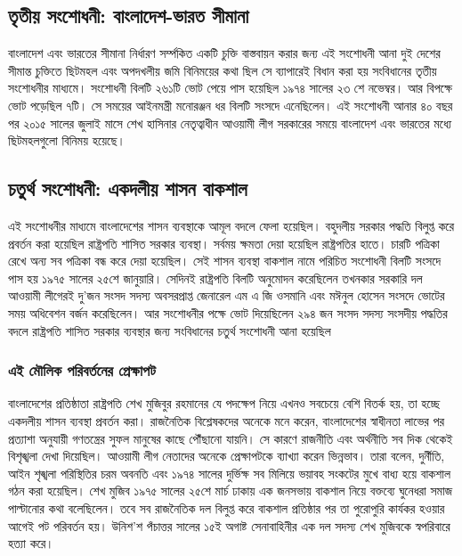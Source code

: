 \documentclass[11pt]{article}
\begin{document}
\subsection{তৃতীয় সংশোধনী: বাংলাদেশ-ভারত সীমানা}
\label{sec:orgc66b266}
বাংলাদেশ এবং ভারতের সীমানা নির্ধারণ সর্ম্পকিত একটি চুক্তি
বাস্তবায়ন করার জন্য এই সংশোধনী আনা দুই দেশের সীমান্ত চুক্তিতে
ছিটমহল এবং অপদখলীয় জমি বিনিময়ের কথা ছিল সে ব্যাপারেই বিধান
করা হয় সংবিধানের তৃতীয় সংশোধনীর মাধ্যমে। সংশোধনী বিলটি ২৬১টি
ভোট পেয়ে পাস হয়েছিল ১৯৭৪ সালের ২৩ শে নভেম্বর। আর বিপক্ষে ভোট
পড়েছিল ৭টি। সে সময়ের আইনমন্ত্রী মনোরঞ্জন ধর বিলটি সংসদে
এনেছিলেন। এই সংশোধনী আনার ৪০ বছর পর ২০১৫ সালের জুলাই মাসে শেখ
হাসিনার নেতৃত্বাধীন আওয়ামী লীগ সরকারের সময়ে বাংলাদেশ এবং
ভারতের মধ্যে ছিটমহলগুলো বিনিময় হয়েছে।

\subsection{চতুর্থ সংশোধনী: একদলীয় শাসন বাকশাল}
\label{sec:orgc11be26}
এই সংশোধনীর মাধ্যমে বাংলাদেশের শাসন ব্যবস্থাকে আমূল বদলে ফেলা
হয়েছিল। বহুদলীয় সরকার পদ্ধতি বিলুপ্ত করে প্রবর্তন করা হয়েছিল
রাষ্ট্রপতি শাসিত সরকার ব্যবস্থা। সর্বময় ক্ষমতা দেয়া হয়েছিল
রাষ্ট্রপতির হাতে। চারটি পত্রিকা রেখে অন্য সব পত্রিকা বন্ধ করে দেয়া
হয়েছিল। সেই শাসন ব্যবস্থা বাকশাল নামে পরিচিত সংশোধনী বিলটি
সংসদে পাস হয় ১৯৭৫ সালের ২৫শে জানুয়ারি। সেদিনই রাষ্ট্রপতি বিলটি
অনুমোদন করেছিলেন তখনকার সরকারি দল আওয়ামী লীগেরই দু'জন সংসদ
সদস্য অবসরপ্রাপ্ত জেনারেল এম এ জি ওসমানি এবং মঈনুল হোসেন সংসদে
ভোটের সময় অধিবেশন বর্জন করেছিলেন। আর সংশোধনীর পক্ষে ভোট
দিয়েছিলেন ২৯৪ জন সংসদ সদস্য সংসদীয় পদ্ধতির বদলে রাষ্ট্রপতি শাসিত
সরকার ব্যবস্থার জন্য সংবিধানের চতুর্থ সংশোধনী আনা হয়েছিল

\subsubsection{এই মৌলিক পরিবর্তনের প্রেক্ষাপট}
\label{sec:org572400b}
বাংলাদেশের প্রতিষ্ঠাতা রাষ্ট্রপতি শেখ মুজিবুর রহমানের যে পদক্ষেপ
নিয়ে এখনও সবচেয়ে বেশি বিতর্ক হয়, তা হচ্ছে একদলীয় শাসন ব্যবস্থা
প্রবর্তন করা। রাজনৈতিক বিশ্লেষকদের অনেকে মনে করেন, বাংলাদেশের
স্বাধীনতা লাভের পর প্রত্যাশা অনুযায়ী গণতন্ত্রের সুফল মানুষের কাছে
পৌঁছানো যায়নি। সে কারণে রাজনীতি এবং অর্থনীতি সব দিক থেকেই
বিশৃঙ্খলা দেখা দিয়েছিল। আওয়ামী লীগ নেতাদের অনেকে প্রেক্ষাপটকে
ব্যাখ্যা করেন ভিন্নভাব। তারা বলেন, দুর্নীতি, আইন শৃঙ্খলা পরিস্থিতির
চরম অবনতি এবং ১৯৭৪ সালের দুর্ভিক্ষ সব মিলিয়ে ভয়াবহ সংকটের মুখে
বাধ্য হয়ে বাকশাল গঠন করা হয়েছিল। শেখ মুজিব ১৯৭৫ সালের ২৫শে
মার্চ ঢাকায় এক জনসভায় বাকশাল নিয়ে বক্তব্যে ঘুনেধরা সমাজ পাল্টানোর
কথা বলেছিলেন। তবে সব রাজনৈতিক দল বিলুপ্ত করে বাকশাল প্রতিষ্ঠার
পর তা পুরোপুরি কার্যকর হওয়ার আগেই পট পরিবর্তন হয়। উনিশ'শ পঁচাত্তর
সালের ১৫ই অগাষ্ট সেনাবাহিনীর এক দল সদস্য শেখ মুজিবকে স্বপরিবারে
হত্যা করে।
\end{document}

